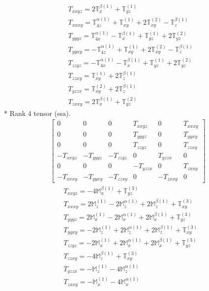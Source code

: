 \documentclass[fleqn,8pt,landscape]{jsarticle}
\begin{document}
\begin{align*}
& T_{xxyz} = 2 \mathbb{T}_{x}^{\beta(1)} + \mathbb{T}_{yz}^{(1)} \\
& T_{xxxy} = \mathbb{T}_{4z}^{\alpha(1)} + \mathbb{T}_{xy}^{(1)} + 2 \mathbb{T}_{xy}^{(2)} - \mathbb{T}_{z}^{\beta(1)} \\
& T_{yyyz} = \mathbb{T}_{4x}^{\alpha(1)} - \mathbb{T}_{x}^{\beta(1)} + \mathbb{T}_{yz}^{(1)} + 2 \mathbb{T}_{yz}^{(2)} \\
& T_{yyxy} = - \mathbb{T}_{4z}^{\alpha(1)} + \mathbb{T}_{xy}^{(1)} + 2 \mathbb{T}_{xy}^{(2)} - \mathbb{T}_{z}^{\beta(1)} \\
& T_{zzyz} = - \mathbb{T}_{4x}^{\alpha(1)} - \mathbb{T}_{x}^{\beta(1)} + \mathbb{T}_{yz}^{(1)} + 2 \mathbb{T}_{yz}^{(2)} \\
& T_{zzxy} = \mathbb{T}_{xy}^{(1)} + 2 \mathbb{T}_{z}^{\beta(1)} \\
& T_{yzzx} = \mathbb{T}_{xy}^{(2)} + 2 \mathbb{T}_{z}^{\beta(1)} \\
& T_{zxxy} = 2 \mathbb{T}_{x}^{\beta(1)} + \mathbb{T}_{yz}^{(2)}
\end{align*}
* Rank 4 tensor (ssa).
\begin{align*}
\begin{bmatrix} 0 & 0 & 0 & T_{xxyz} & 0 & T_{xxxy} \\ 0 & 0 & 0 & T_{yyyz} & 0 & T_{yyxy} \\ 0 & 0 & 0 & T_{zzyz} & 0 & T_{zzxy} \\ - T_{xxyz} & - T_{yyyz} & - T_{zzyz} & 0 & T_{yzzx} & 0 \\ 0 & 0 & 0 & - T_{yzzx} & 0 & T_{zxxy} \\ - T_{xxxy} & - T_{yyxy} & - T_{zzxy} & 0 & - T_{zxxy} & 0 \end{bmatrix}
\end{align*}
\begin{align*}
& T_{xxyz} = - 4 \mathbb{M}_{x}^{\beta(1)} + \mathbb{T}_{yz}^{(3)} \\
& T_{xxxy} = 2 \mathbb{M}_{z}^{(1)} - 2 \mathbb{M}_{z}^{\alpha(1)} + 2 \mathbb{M}_{z}^{\beta(1)} + \mathbb{T}_{xy}^{(3)} \\
& T_{yyyz} = 2 \mathbb{M}_{x}^{(1)} - 2 \mathbb{M}_{x}^{\alpha(1)} + 2 \mathbb{M}_{x}^{\beta(1)} + \mathbb{T}_{yz}^{(3)} \\
& T_{yyxy} = - 2 \mathbb{M}_{z}^{(1)} + 2 \mathbb{M}_{z}^{\alpha(1)} + 2 \mathbb{M}_{z}^{\beta(1)} + \mathbb{T}_{xy}^{(3)} \\
& T_{zzyz} = - 2 \mathbb{M}_{x}^{(1)} + 2 \mathbb{M}_{x}^{\alpha(1)} + 2 \mathbb{M}_{x}^{\beta(1)} + \mathbb{T}_{yz}^{(3)} \\
& T_{zzxy} = - 4 \mathbb{M}_{z}^{\beta(1)} + \mathbb{T}_{xy}^{(3)} \\
& T_{yzzx} = - \mathbb{M}_{z}^{(1)} - 4 \mathbb{M}_{z}^{\alpha(1)} \\
& T_{zxxy} = - \mathbb{M}_{x}^{(1)} - 4 \mathbb{M}_{x}^{\alpha(1)}
\end{align*}
\end{document}
